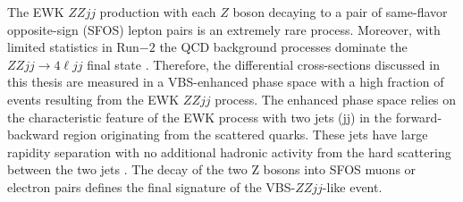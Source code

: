 The EWK $ZZjj$ production with each $Z$ boson decaying to a pair of same-flavor opposite-sign (SFOS) lepton pairs is an extremely rare process. Moreover, with limited statistics in Run$-2$ the QCD background processes dominate the $ZZjj \rightarrow 4\ell jj$ final state \cite{ATLASZZjj}. Therefore, the differential cross-sections discussed in this thesis are measured in a VBS-enhanced phase space with a high fraction of events resulting from the EWK $ZZjj$ process. The enhanced phase space relies on the characteristic feature of the EWK process with two jets (jj) in the forward-backward region originating from the scattered quarks. These jets have large rapidity separation with no additional hadronic activity from the hard scattering between the two jets \cite{RapidityGapCite}. The decay of the two Z bosons into SFOS muons or electron pairs defines the final signature of the VBS-$ZZjj$-like event.
